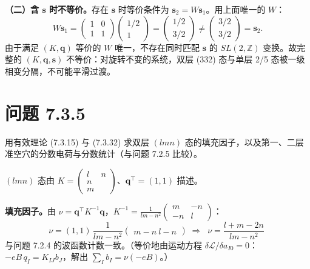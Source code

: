 \textbf{（二）含 $\pmb{s}$ 时不等价。}存在 $\pmb{s}$ 时等价条件为 $\pmb{s}_2=W\pmb{s}_1$。用上面唯一的 $W$：
\begin{equation*}
W\pmb{s}_1=\begin{pmatrix}1&0\\1&1\end{pmatrix}\begin{pmatrix}1/2\\1\end{pmatrix}
=\begin{pmatrix}1/2\\3/2\end{pmatrix}\neq\begin{pmatrix}3/2\\3/2\end{pmatrix}=\pmb{s}_2 .
\end{equation*}
由于满足 $(K,\pmb{q})$ 等价的 $W$ 唯一，不存在同时匹配 $\pmb{s}$ 的 $SL(2,\mathbb Z)$ 变换。故完整的 $(K,\pmb{q},\pmb{s})$ 不等价：对旋转不变的系统，双层 (332) 态与单层 2/5 态被一级相变分隔，不可能平滑过渡。

\section*{问题 7.3.5}
\begin{problem}
用有效理论 (7.3.15) 与 (7.3.32) 求双层 $(lmn)$ 态的填充因子，以及第一、二层准空穴的分数电荷与分数统计（与问题 7.2.5 比较）。
\end{problem}
\solution
$(lmn)$ 态由 $K=\begin{pmatrix}l&n\\n\\m\end{pmatrix}$、$\pmb{q}^{\top}=(1,1)$ 描述。

\textbf{填充因子。}由 $\nu=\pmb{q}^{\top}K^{-1}\pmb{q}$，$K^{-1}=\frac{1}{lm-n^2}\begin{pmatrix}m&-n\\-n&l\end{pmatrix}$：
\begin{equation*}
\nu=(1,1)\,\frac{1}{lm-n^2}\begin{pmatrix}m-n\ l-n\end{pmatrix}
\;\Longrightarrow\;
\boxed{\;\nu=\frac{l+m-2n}{lm-n^2}\;}
\end{equation*}
与问题 7.2.4 的波函数计数一致。（等价地由运动方程 $\delta\mathcal{L}/\delta a_{I0}=0$：$-eB\,q_I=K_{IJ}b_J$，解出 $\sum_Ib_I=\nu(-eB)$。）

